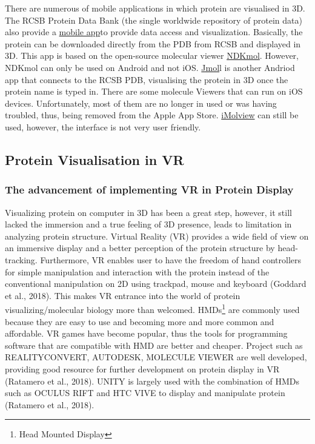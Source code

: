 There are numerous of mobile applications in which protein are visualised in 3D. The RCSB Protein Data Bank (the single worldwide repository of protein data) also provide a \href{https://www.ncbi.nlm.nih.gov/pmc/articles/PMC4271143/}{mobile app}to provide data access and visualization. Basically, the protein can be downloaded directly from the PDB from RCSB and displayed in 3D. This app is based on the open-source molecular viewer \href{https://play.google.com/store/apps/details?id=jp.sfjp.webglmol.NDKmol&hl=en}{NDKmol}. However, NDKmol can only be used on Android and not iOS. \href{https://www.imedicalapps.com/2013/08/jmol-molecular-visualization-app/}{Jmol}l is another Andriod app that connects to the RCSB PDB, visualising the protein in 3D once the protein name is typed in.
There are some molecule Viewers that can run on iOS devices. Unfortunately, most of them are no longer in used or was having troubled, thus, being removed from the Apple App Store. \href{https://www.molsoft.com/iMolview.html}{iMolview} can still be used, however, the interface is not very user friendly. 


\subsection{Protein Visualisation in VR}
\subsubsection{The advancement of implementing VR in Protein Display}
Visualizing protein on computer in 3D has been a great step, however, it still lacked the immersion and a true feeling of 3D presence, leads to limitation in analyzing protein structure. Virtual Reality (VR) provides a wide field of view on an immersive display and a better perception of the protein structure by head-tracking. Furthermore, VR enables user to have the freedom of hand controllers for simple manipulation and interaction with the protein instead of the conventional manipulation on 2D using trackpad, mouse and keyboard (Goddard et al., 2018). This makes VR entrance into the world of protein visualizing/molecular biology more than welcomed. 
HMDs\footnote{Head Mounted Display} are commonly used because they are easy to use and becoming more and more common and affordable. VR games have become popular, thus the tools for programming software that are compatible with HMD are better and cheaper. Project such as {\footnotesize REALITYCONVERT}, {\footnotesize AUTODESK}, {\footnotesize MOLECULE VIEWER} are well developed, providing good resource for further development on protein display in VR (Ratamero et al., 2018). {\footnotesize UNITY} is largely used with the combination of HMDs such as {\footnotesize OCULUS RIFT} and {\footnotesize HTC VIVE} to display and manipulate protein (Ratamero et al., 2018).

